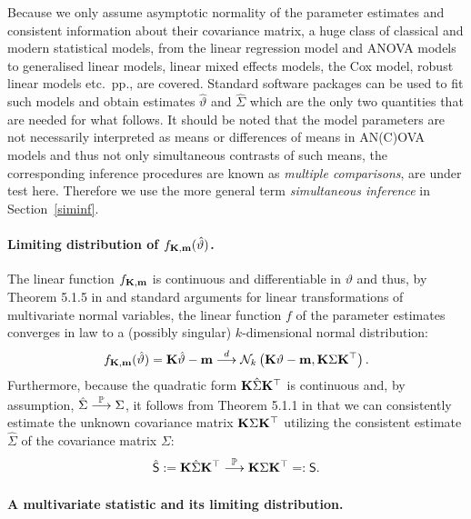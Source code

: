 \documentclass[12pt]{article}
\begin{document}
Because we only assume asymptotic normality of the parameter estimates
and consistent information about their covariance matrix,
a huge class of classical and modern statistical models, from the linear
regression model and ANOVA models to generalised linear models, linear mixed
effects models, the Cox model, robust linear models etc.~pp., are 
covered. Standard software packages can be used to fit such models
and obtain estimates $\hat{\vartheta}$ and $\hat{\Sigma}$ which
are the only two quantities that are needed for what follows.
It should be noted that the model parameters are not necessarily
interpreted as means or differences of means in AN(C)OVA models
and thus not only simultaneous contrasts of such means, the corresponding
inference procedures are known as \emph{multiple comparisons}, 
are under test here. Therefore we use the more general term
\emph{simultaneous inference} in Section~\ref{siminf}.


\paragraph{Limiting distribution of $f_{\mathbf{K},\mathbf{m}}(\hat{\vartheta})$.}

The linear function $f_{\mathbf{K}, \mathbf{m}}$ is continuous and differentiable in
$\vartheta$ and thus, by Theorem 5.1.5 in \cite{Lehmann1999} and
standard arguments for linear transformations of multivariate normal
variables,
the linear function $f$ of the parameter estimates
converges in law to a (possibly singular) $k$-dimensional normal 
distribution:
\begin{eqnarray} \label{dist_f}
f_{\mathbf{K}, \mathbf{m}}(\hat{\vartheta}) = \mathbf{K} \hat{\vartheta} - \mathbf{m} 
\stackrel{d}{\longrightarrow} \mathcal{N}_k\left(\mathbf{K} \vartheta - \mathbf{m}, \mathbf{K} \Sigma \mathbf{K}^\top\right).
\end{eqnarray}
Furthermore, because the quadratic form $\mathbf{K} \hat{\Sigma} \mathbf{K}^\top$
is continuous and, by assumption, $\hat{\Sigma} \stackrel{\mathbb{P}}{\longrightarrow} \Sigma$, 
it follows from Theorem 5.1.1 in \cite{Lehmann1999} that we can 
consistently estimate the unknown covariance matrix $\mathbf{K} \Sigma \mathbf{K}^\top$ utilizing
the consistent estimate $\hat{\Sigma}$ of the covariance matrix $\Sigma$:
\begin{eqnarray*}
\hat{\textsf{S}} := \mathbf{K} \hat{\Sigma} \mathbf{K}^\top \stackrel{\mathbb{P}}{\longrightarrow} \mathbf{K} \Sigma \mathbf{K}^\top =: \textsf{S}.
\end{eqnarray*}

\paragraph{A multivariate statistic and its limiting distribution.}
\end{document}
